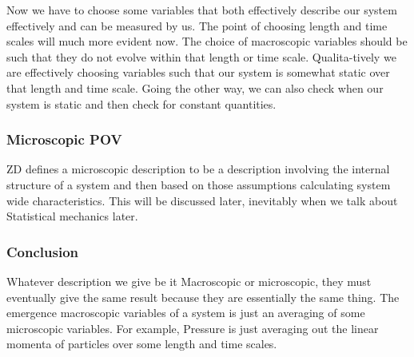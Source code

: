 \documentclass[a4paper]{article}
\begin{document}
   Now we have to choose some variables that both effectively describe our system effectively and 
   can be measured by us. The point of choosing length and time scales will much more evident now.
    The choice of macroscopic variables should be such that they do not evolve within that length 
   or time scale. Qualita-tively we are effectively choosing variables such that our system is 
   somewhat static over that length and time scale. Going the other way, we can also check when our
    system is static and then check for constant quantities. 
   \subsubsection{Microscopic POV}
   ZD defines a microscopic description to be a description involving the internal structure of a 
   system and then based on those assumptions calculating system wide characteristics. This will 
   be discussed later, inevitably when we talk about Statistical mechanics later.
   \subsubsection{Conclusion}
   Whatever description we give be it Macroscopic or microscopic, they must eventually give the 
   same result because they are essentially the same thing. The emergence macroscopic variables 
   of a system is just an averaging of some microscopic variables. For example, Pressure is just 
   averaging out the linear momenta of particles over some length and time scales.
\end{document}
